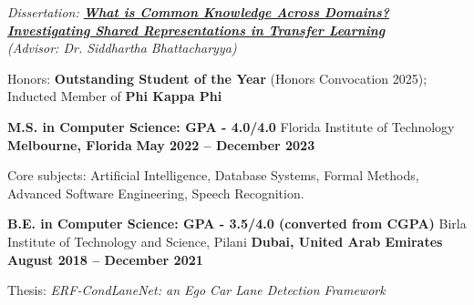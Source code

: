 \begin{cventries}
{\begin{cvitems}
\item \emph{Dissertation: \href{https://repository.fit.edu/etd/1634/}{\emph{\textbf{What is Common Knowledge Across Domains? Investigating Shared Representations in Transfer Learning}}} \\(Advisor: Dr. Siddhartha Bhattacharyya)}
\item {Honors: \textbf{Outstanding Student of the Year} (Honors Convocation 2025); Inducted Member of \textbf{Phi Kappa Phi}}
\end{cvitems}
}
\cventry
{\textbf{M.S. in Computer Science: GPA - 4.0/4.0}}
{Florida Institute of Technology}
{\textbf{Melbourne, Florida}}
{\textbf{May 2022 – December 2023}}
{
\begin{cvitems}
    \item Core subjects: Artificial Intelligence, Database Systems, Formal Methods, Advanced Software Engineering, Speech Recognition.
\end{cvitems}
}
\cventry
{\textbf{B.E. in Computer Science: GPA - 3.5/4.0 (converted from CGPA)}} %
{Birla Institute of Technology and Science, Pilani} %
{\textbf{Dubai, United Arab Emirates}} %
{\textbf{August 2018 – December 2021}} %
{ %
\begin{cvitems}
    \item {Thesis: \emph{ERF-CondLaneNet: an Ego Car Lane Detection Framework}}
\end{cvitems}
}
\end{cventries}

